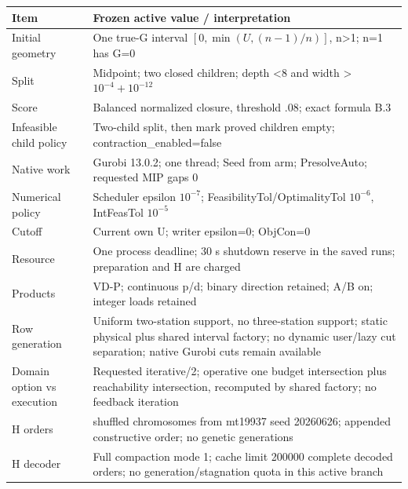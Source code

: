 \documentclass[
  american,
  11pt,
]{article}
\newcounter{none} %
\begin{document}
{\def\LTcaptype{none} %
\begin{longtable}[]{@{}
  >{\raggedright\arraybackslash}p{}
  >{\raggedright\arraybackslash}p{}@{}}
\toprule\noalign{}
\begin{minipage}[b]{\linewidth}\raggedright
Item
\end{minipage} & \begin{minipage}[b]{\linewidth}\raggedright
Frozen active value / interpretation
\end{minipage} \\
\midrule\noalign{}
\endhead
\bottomrule\noalign{}
\endlastfoot
Initial geometry & One true-G interval \([0,\min(U,(n-1)/n)]\),
n\textgreater1; n=1 has G=0 \\
Split & Midpoint; two closed children; depth \textless8 and width
\textgreater{}\(10^{-4}+10^{-12}\) \\
Score & Balanced normalized closure, threshold .08; exact formula B.3 \\
Infeasible child policy & Two-child split, then mark proved children
empty; contraction\_\allowbreak{}enabled=false \\
Native work & Gurobi 13.0.2; one thread; Seed from arm; PresolveAuto;
requested MIP gaps 0 \\
Numerical policy & Scheduler epsilon \(10^{-7}\);
FeasibilityTol/OptimalityTol \(10^{-6}\), IntFeasTol \(10^{-5}\) \\
Cutoff & Current own U; writer epsilon=0; ObjCon=0 \\
Resource & One process deadline; 30 s shutdown reserve in the saved
runs; preparation and H are charged \\
Products & VD-P; continuous p/d; binary direction retained; A/B on;
integer loads retained \\
Row generation & Uniform two-station support, no three-station support;
static physical plus shared interval factory; no dynamic user/lazy cut
separation; native Gurobi cuts remain available \\
Domain option vs execution & Requested iterative/2; operative one budget
intersection plus reachability intersection, recomputed by shared
factory; no feedback iteration \\
H orders & 24 shuffled chromosomes from mt19937 seed 20260626; appended
constructive order; no genetic generations \\
H decoder & Full compaction mode 1; cache limit 200000 complete decoded
orders; no generation/stagnation quota in this active branch \\
\end{longtable}
}
\end{document}
